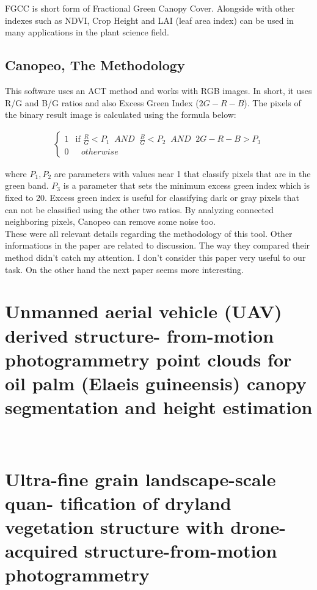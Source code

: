 \documentclass{article}
\begin{document}
FGCC is short form of Fractional Green Canopy Cover. Alongside with other indexes such as NDVI, Crop Height and LAI (leaf area index) can be used in many applications in the plant science field. 

\subsection{Canopeo, The Methodology}

This software uses an ACT method and works with RGB images. In short, it uses R/G and B/G ratios and also Excess Green Index ($2G - R - B$). The pixels of the binary result image is calculated using the formula below:

\begin{eqnarray}
\left\{
	\begin{array}{ll}
		1  & \mbox{if } \frac{R}{G} < P_1 \;\;AND\;\; \frac{B}{G} < P_2 \;\;AND\;\; 2G - R - B > P_3 \\
		0 & \mbox{ } otherwise
	\end{array}
\right.
\end{eqnarray}

where $P_1, P_2$ are parameters with values near 1 that classify pixels that are in the green band. $P_3$ is a parameter that sets the minimum excess green index which is fixed to 20. Excess green index is useful for classifying dark or gray pixels that can not be classified using the other two ratios. By analyzing connected neighboring pixels, Canopeo can remove some noise too. \\

These were all relevant details regarding the methodology of this tool. Other informations in the paper are related to discussion. The way they compared their method didn't catch my attention. I don't consider this paper very useful to our task. On the other hand the next paper seems more interesting. \\

\section{Unmanned aerial vehicle (UAV) derived structure-
from-motion photogrammetry point clouds for oil
palm (Elaeis guineensis) canopy segmentation and
height estimation ~\cite{fawcett_uav_2019_canopy}}


\section{Ultra-fine grain landscape-scale quan-
tification of dryland vegetation structure with drone-acquired structure-from-motion photogrammetry ~\cite{cunliffe-2016-ultra}}
\end{document}
